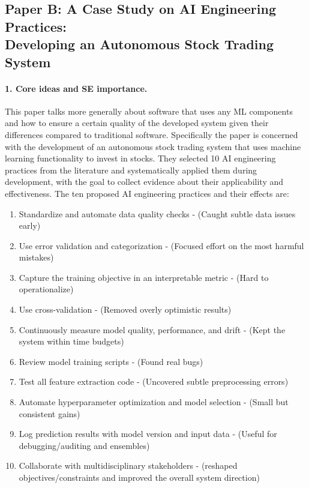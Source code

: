 \documentclass[11pt,a4paper]{article}
\begin{document}
\subsection{Paper B: A Case Study on AI Engineering Practices: \\
Developing an Autonomous Stock Trading System \cite{cainA}}


\paragraph{1. Core ideas and SE importance.}
This paper talks more generally about software that uses any ML components and how to ensure a certain quality of the developed system given their differences compared to traditional software. Specifically the paper is concerned with the development of an
autonomous stock trading system that uses machine learning
functionality to invest in stocks. They selected 10 AI engineering
practices from the literature and systematically applied them
during development, with the goal to collect evidence about
their applicability and effectiveness. The ten proposed AI engineering practices and their effects are: 

\begin{enumerate}
    \item Standardize and automate data quality checks - (Caught subtle data issues early)
    \item Use error validation and categorization - (Focused effort on the most harmful mistakes)
    \item Capture the training objective in an interpretable metric - (Hard to operationalize)
    \item Use cross-validation - (Removed overly optimistic results)
    \item Continuously measure model quality, performance, and drift - (Kept the system within time budgets)
    \item Review model training scripts - (Found real bugs)
    \item Test all feature extraction code - (Uncovered subtle preprocessing errors)
    \item Automate hyperparameter optimization and model selection - (Small but consistent gains)
    \item Log prediction results with model version and input data - (Useful for debugging/auditing and ensembles)
    \item Collaborate with multidisciplinary stakeholders - (reshaped objectives/constraints and improved the overall system direction)
\end{enumerate}
\end{document}
